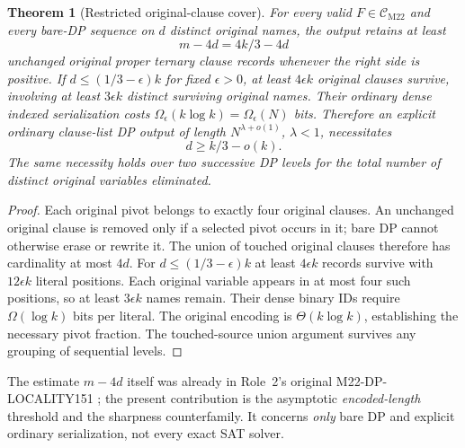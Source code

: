 \documentclass[11pt]{article}
\newtheorem{theorem}{Theorem}
\newcommand{\CM}{\mathcal C_{\mathrm{M22}}}
\begin{document}
\begin{theorem}[Restricted original-clause cover]
For every valid $F\in\CM$ and every bare-DP sequence on $d$ distinct
original names, the output retains at least
\[
\boxed{m-4d=4k/3-4d}
\]
unchanged original proper ternary clause records whenever the right
side is positive. If $d\le(1/3-\epsilon)k$ for fixed $\epsilon>0$,
at least $4\epsilon k$ original clauses survive, involving at least
$3\epsilon k$ distinct surviving original names.
Their ordinary dense indexed serialization costs
$\Omega_\epsilon(k\log k)=\Omega_\epsilon(N)$ bits.
Therefore an \emph{explicit ordinary clause-list} DP output
of length $N^{\lambda+o(1)}$, $\lambda<1$, necessitates
\[
\boxed{d\ge k/3-o(k).}
\]
The same necessity holds over two successive DP levels for the
\emph{total} number of distinct original variables eliminated.
\end{theorem}
\begin{proof}
Each original pivot belongs to exactly four original clauses.
An unchanged original clause is removed only if a selected pivot
occurs in it; bare DP cannot otherwise erase or rewrite it.
The union of touched original clauses therefore has cardinality
at most $4d$. For $d\le(1/3-\epsilon)k$ at least $4\epsilon k$
records survive with $12\epsilon k$ literal positions. Each
original variable appears in at most four such positions, so at
least $3\epsilon k$ names remain. Their dense binary IDs require
$\Omega(\log k)$ bits per literal. The original encoding is
$\Theta(k\log k)$, establishing the necessary pivot fraction.
The touched-source union argument survives any grouping of
sequential levels.
\end{proof}
The estimate $m-4d$ itself was already in Role~2's original
M22-DP-LOCALITY151 \cite{role2}; the present contribution is the
asymptotic \emph{encoded-length} threshold and the sharpness
counterfamily. It concerns \emph{only} bare DP and explicit
ordinary serialization, not every exact SAT solver.
\end{document}
